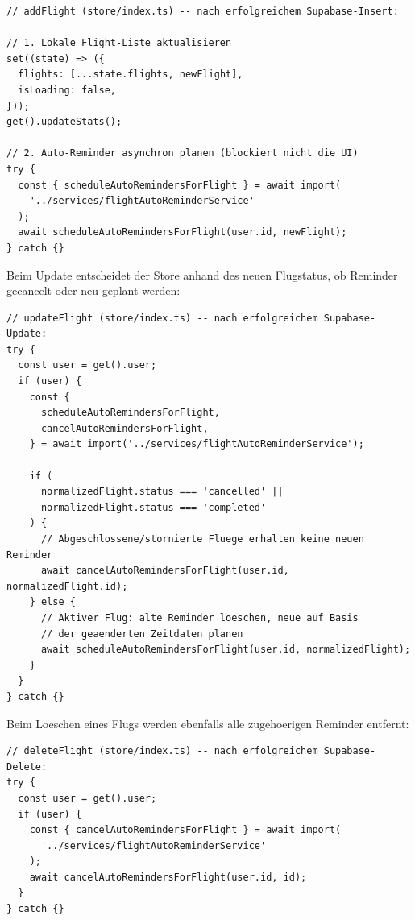 \begin{lstlisting}[style=skyline-ts,
  caption={Integration der Reminder-Logik beim Flight-Save (store/index.ts)},
  label={lst:store_addflight}]
// addFlight (store/index.ts) -- nach erfolgreichem Supabase-Insert:

// 1. Lokale Flight-Liste aktualisieren
set((state) => ({
  flights: [...state.flights, newFlight],
  isLoading: false,
}));
get().updateStats();

// 2. Auto-Reminder asynchron planen (blockiert nicht die UI)
try {
  const { scheduleAutoRemindersForFlight } = await import(
    '../services/flightAutoReminderService'
  );
  await scheduleAutoRemindersForFlight(user.id, newFlight);
} catch {}
\end{lstlisting}

Beim Update entscheidet der Store anhand des neuen Flugstatus, ob Reminder
gecancelt oder neu geplant werden:

\begin{lstlisting}[style=skyline-ts,
  caption={Reminder-Neuplanung bei Flug-Update (store/index.ts)},
  label={lst:store_updateflight}]
// updateFlight (store/index.ts) -- nach erfolgreichem Supabase-Update:
try {
  const user = get().user;
  if (user) {
    const {
      scheduleAutoRemindersForFlight,
      cancelAutoRemindersForFlight,
    } = await import('../services/flightAutoReminderService');

    if (
      normalizedFlight.status === 'cancelled' ||
      normalizedFlight.status === 'completed'
    ) {
      // Abgeschlossene/stornierte Fluege erhalten keine neuen Reminder
      await cancelAutoRemindersForFlight(user.id, normalizedFlight.id);
    } else {
      // Aktiver Flug: alte Reminder loeschen, neue auf Basis
      // der geaenderten Zeitdaten planen
      await scheduleAutoRemindersForFlight(user.id, normalizedFlight);
    }
  }
} catch {}
\end{lstlisting}

Beim Loeschen eines Flugs werden ebenfalls alle zugehoerigen Reminder entfernt:

\begin{lstlisting}[style=skyline-ts,
  caption={Reminder-Cancel beim Loeschen eines Flugs (store/index.ts)},
  label={lst:store_deleteflight}]
// deleteFlight (store/index.ts) -- nach erfolgreichem Supabase-Delete:
try {
  const user = get().user;
  if (user) {
    const { cancelAutoRemindersForFlight } = await import(
      '../services/flightAutoReminderService'
    );
    await cancelAutoRemindersForFlight(user.id, id);
  }
} catch {}
\end{lstlisting}

